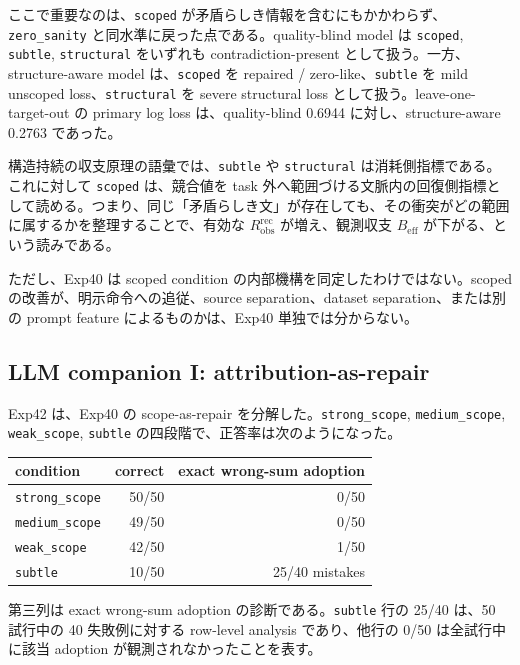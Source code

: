 \documentclass[12pt,a4paper]{article}
\begin{document}
ここで重要なのは、\texttt{scoped} が矛盾らしき情報を含むにもかかわらず、\texttt{zero\_sanity} と同水準に戻った点である。quality-blind model は \texttt{scoped}, \texttt{subtle}, \texttt{structural} をいずれも contradiction-present として扱う。一方、structure-aware model は、\texttt{scoped} を repaired / zero-like、\texttt{subtle} を mild unscoped loss、\texttt{structural} を severe structural loss として扱う。leave-one-target-out の primary log loss は、quality-blind 0.6944 に対し、structure-aware 0.2763 であった。

構造持続の収支原理の語彙では、\texttt{subtle} や \texttt{structural} は消耗側指標である。これに対して \texttt{scoped} は、競合値を task 外へ範囲づける文脈内の回復側指標として読める。つまり、同じ「矛盾らしき文」が存在しても、その衝突がどの範囲に属するかを整理することで、有効な \(R_{\mathrm{obs}}^{\mathrm{rec}}\) が増え、観測収支 \(B_{\mathrm{eff}}\) が下がる、という読みである。

ただし、Exp40 は scoped condition の内部機構を同定したわけではない。scoped の改善が、明示命令への追従、source separation、dataset separation、または別の prompt feature によるものかは、Exp40 単独では分からない。

\subsection{LLM companion I: attribution-as-repair}\label{llm-companion-i-attribution-as-repair}

Exp42 は、Exp40 の scope-as-repair を分解した。\texttt{strong\_scope}, \texttt{medium\_scope}, \texttt{weak\_scope}, \texttt{subtle} の四段階で、正答率は次のようになった。

{\def\LTcaptype{table} %
\begin{longtable}[]{@{}lrr@{}}
\toprule\noalign{}
condition & correct & exact wrong-sum adoption \\
\midrule\noalign{}
\endhead
\bottomrule\noalign{}
\endlastfoot
\texttt{strong\_scope} & 50/50 & 0/50 \\
\texttt{medium\_scope} & 49/50 & 0/50 \\
\texttt{weak\_scope} & 42/50 & 1/50 \\
\texttt{subtle} & 10/50 & 25/40 mistakes \\
\end{longtable}
}

第三列は exact wrong-sum adoption の診断である。\texttt{subtle} 行の 25/40 は、50 試行中の 40 失敗例に対する row-level analysis であり、他行の 0/50 は全試行中に該当 adoption が観測されなかったことを表す。
\end{document}
